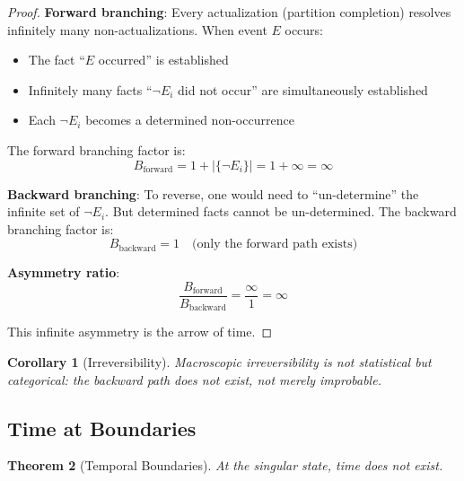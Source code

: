 \documentclass[twocolumn,10pt,a4paper]{article}
\newtheorem{theorem}{Theorem}[section]
\newtheorem{corollary}[theorem]{Corollary}
\theoremstyle{definition}
\theoremstyle{remark}
\begin{document}
\begin{proof}
\textbf{Forward branching}: Every actualization (partition completion) resolves infinitely many non-actualizations. When event $E$ occurs:
\begin{itemize}
    \item The fact ``$E$ occurred'' is established
    \item Infinitely many facts ``$\neg E_i$ did not occur'' are simultaneously established
    \item Each $\neg E_i$ becomes a determined non-occurrence
\end{itemize}

The forward branching factor is:
\begin{equation}
    B_{\text{forward}} = 1 + |\{\neg E_i\}| = 1 + \infty = \infty
\end{equation}

\textbf{Backward branching}: To reverse, one would need to ``un-determine'' the infinite set of $\neg E_i$. But determined facts cannot be un-determined. The backward branching factor is:
\begin{equation}
    B_{\text{backward}} = 1 \quad \text{(only the forward path exists)}
\end{equation}

\textbf{Asymmetry ratio}:
\begin{equation}
    \frac{B_{\text{forward}}}{B_{\text{backward}}} = \frac{\infty}{1} = \infty
\end{equation}

This infinite asymmetry is the arrow of time.
\end{proof}

\begin{corollary}[Irreversibility]
\label{cor:irreversibility}
Macroscopic irreversibility is not statistical but categorical: the backward path does not exist, not merely improbable.
\end{corollary}

\subsection{Time at Boundaries}

\begin{theorem}[Temporal Boundaries]
\label{thm:boundaries}
At the singular state, time does not exist.
\end{theorem}
\end{document}
